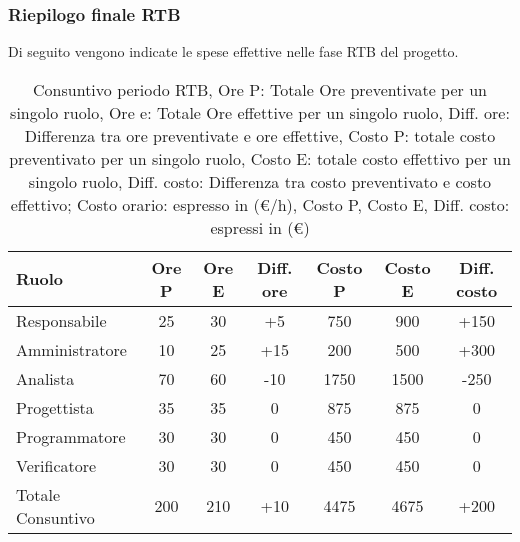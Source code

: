 \subsubsection{Riepilogo finale RTB}
Di seguito vengono indicate le spese effettive nelle fase RTB del progetto.
\begin{table}[H]
	\centering
	\begin{tabular}{l|c|c|c|c|c|c}
		\textbf{Ruolo}    & \textbf{Ore P} & \textbf{Ore E} & \textbf{Diff. ore} & \textbf{Costo P} & \textbf{Costo E} & \textbf{Diff. costo} \\
		\hline
		Responsabile      & 25             & 30             & +5                 & 750              & 900              & +150                 \\
		Amministratore    & 10             & 25             & +15                & 200              & 500              & +300                 \\
		Analista          & 70             & 60             & -10                & 1750             & 1500             & -250                 \\
		Progettista       & 35             & 35             & 0                  & 875              & 875              & 0                    \\
		Programmatore     & 30             & 30             & 0                  & 450              & 450              & 0                    \\
		Verificatore      & 30             & 30             & 0                  & 450              & 450              & 0                    \\
		\hline
		Totale Consuntivo & 200            & 210            & +10                & 4475             & 4675             & +200                 \\
		\hline
	\end{tabular}
	\caption{Consuntivo periodo RTB, Ore P: Totale Ore preventivate per un singolo ruolo, Ore e: Totale Ore effettive per un singolo ruolo,
		Diff. ore: Differenza tra ore preventivate e ore effettive, Costo P: totale costo preventivato per un singolo ruolo,
		Costo E: totale costo effettivo per un singolo ruolo,  Diff. costo: Differenza tra costo preventivato e costo effettivo;
		Costo orario: espresso in (\euro/h), Costo P, Costo E, Diff. costo: espressi in (\euro)}
\end{table}


